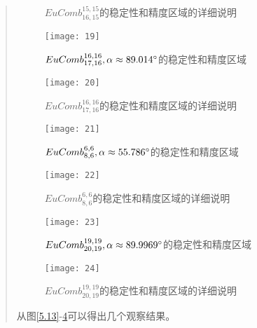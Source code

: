\documentclass{article}
\begin{document}
\begin{CJK}{UTF8}{gkai}
\begin{quotation}
\begin{figure}[htbp]
{\begin{minipage}{6cm}
			\caption{$EuComb_{16,15}^{15,15}$的稳定性和精度区域的详细说明}
			\label{5.18}
		\end{minipage}
	}
\end{figure}
\begin{figure}[htbp]
{
		\begin{minipage}{6cm}
			\centering
			\texttt{[image: 19]}
			\caption{$EuComb_{17,16}^{16,16},\\ \alpha \approx 89.014^{\circ}$的稳定性和精度区域}
			\label{5.19}
		\end{minipage}
	}
{
		\begin{minipage}{6cm}
			\centering
			\texttt{[image: 20]}
			\caption{$EuComb_{17,16}^{16,16}$的稳定性和精度区域的详细说明}
			\label{5.20}
		\end{minipage}
	}
\end{figure}
\begin{figure}[htbp]
{
		\begin{minipage}{6cm}
			\centering
			\texttt{[image: 21]}
			\caption{$EuComb_{8,6}^{6,6},\\ \alpha \approx 55.786^{\circ}$的稳定性和精度区域}
			\label{5.21}
		\end{minipage}
	}
{
		\begin{minipage}{6cm}
			\centering
			\texttt{[image: 22]}
			\caption{$EuComb_{8,6}^{6,6}$的稳定性和精度区域的详细说明}
			\label{5.22}
		\end{minipage}
	}
\end{figure}
\begin{figure}[htbp]
{
		\begin{minipage}{6cm}
			\centering
			\texttt{[image: 23]}
			\caption{$EuComb_{20,19}^{19,19},\\ \alpha \approx 89.9969^{\circ}$的稳定性和精度区域}
			\label{5.23}
		\end{minipage}
	}
{
		\begin{minipage}{6cm}
			\centering
			\texttt{[image: 24]}
			\caption{$EuComb_{20,19}^{19,19}$的稳定性和精度区域的详细说明}
			\label{5.24}
		\end{minipage}
	}
\end{figure}
从图\ref{5.13}-\ref{5.24}可以得出几个观察结果。\\


\end{quotation}
\end{CJK}
\end{document}
